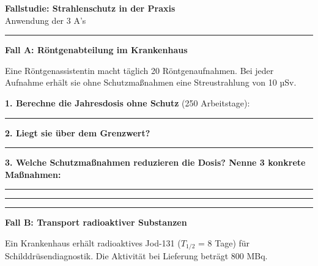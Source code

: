 \documentclass[10pt, a4paper]{article}
\newcommand{\fachfarbe}{physik}
\newcommand{\luecke}[1]{\rule{#1}{0.4pt}}
\newcommand{\abschnitt}[1]{%
    \vspace{8pt}\noindent\textbf{\textcolor{\fachfarbe}{#1}}\vspace{4pt}
}
\begin{document}

\newpage

\begin{center}
{\large\bfseries Fallstudie: Strahlenschutz in der Praxis}\\[2pt]
{\small\textcolor{grau}{Anwendung der 3 A's}}
\end{center}
\vspace{-2pt}\hrule\vspace{12pt}

\abschnitt{Fall A: Röntgenabteilung im Krankenhaus}

\begin{merksatz}[Szenario]
Eine Röntgenassistentin macht täglich 20 Röntgenaufnahmen. Bei jeder Aufnahme erhält sie ohne Schutzmaßnahmen eine Streustrahlung von 10 µSv.
\end{merksatz}

\vspace{6pt}

\textbf{1. Berechne die Jahresdosis ohne Schutz} (250 Arbeitstage):

\vspace{4pt}
\luecke{14cm}

\vspace{8pt}

\textbf{2. Liegt sie über dem Grenzwert?} \luecke{6cm}

\vspace{8pt}

\textbf{3. Welche Schutzmaßnahmen reduzieren die Dosis? Nenne 3 konkrete Maßnahmen:}

\vspace{4pt}
\luecke{14cm}

\vspace{4pt}
\luecke{14cm}

\vspace{4pt}
\luecke{14cm}

\vspace{12pt}

\abschnitt{Fall B: Transport radioaktiver Substanzen}

\begin{merksatz}[Szenario]
Ein Krankenhaus erhält radioaktives Jod-131 ($T_{1/2}$ = 8 Tage) für Schilddrüsendiagnostik. Die Aktivität bei Lieferung beträgt 800 MBq.
\end{merksatz}

\vspace{6pt}
\end{document}
